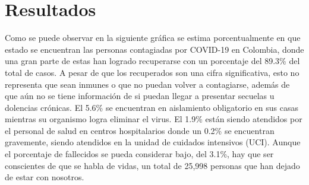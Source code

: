 \documentclass[conference,compsoc,onecolumn]{IEEEtran}
\begin{document}
\label{sec:results}

\section{Resultados}
Como se puede observar en la siguiente gráfica se estima porcentualmente en que estado se encuentran las personas contagiadas por COVID-19 en Colombia, donde una gran parte de estas han logrado recuperarse con un porcentaje del 89.3\% del total de casos. A pesar de que los recuperados son una cifra significativa, esto no representa que sean inmunes o que no puedan volver a contagiarse, además de que aún no se tiene información de si puedan llegar a presentar secuelas u dolencias crónicas. El 5.6\% se encuentran en aislamiento obligatorio en sus casas mientras su organismo logra eliminar el virus. El 1.9\% están siendo atendidos por el personal de salud en centros hospitalarios donde un 0.2\% se encuentran gravemente, siendo atendidos en la unidad de cuidados intensivos (UCI). Aunque el porcentaje de fallecidos se pueda considerar bajo, del 3.1\%, hay que ser conscientes de que se habla de vidas, un total de 25,998 personas que han dejado de estar con nosotros.\\
\end{document}
